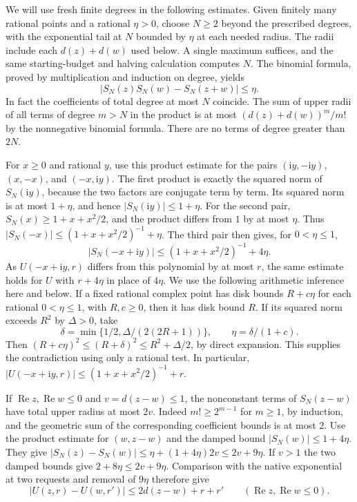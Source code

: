 \documentclass[11pt]{amsart}
\theoremstyle{definition}
\theoremstyle{remark}
\numberwithin{equation}{section}
\newcommand{\re}{\operatorname{Re}}
\begin{document}
We will use fresh finite degrees in the following estimates.
Given finitely many rational points and a rational $\eta>0$,
choose $N\ge2$ beyond the prescribed degrees, with the
exponential tail at $N$ bounded by $\eta$ at each needed
radius. The radii include each $d(z)+d(w)$ used below. A
single maximum suffices, and the same starting-budget and
halving calculation computes $N$. The binomial formula,
proved by multiplication and induction on degree, yields
\[
 |S_N(z)S_N(w)-S_N(z+w)|\le\eta .
\]
In fact the coefficients of total degree at most $N$
coincide. The sum of upper radii of all terms of degree
$m>N$ in the product is at most
$(d(z)+d(w))^m/m!$ by the nonnegative binomial formula.
There are no terms of degree greater than $2N$.

For $x\ge0$ and rational $y$, use this product estimate for
the pairs $(\mathrm i y,-\mathrm i y)$, $(x,-x)$,
and $(-x,\mathrm i y)$. The first product is exactly the
squared norm of $S_N(\mathrm i y)$, because the two factors
are conjugate term by term. Its squared norm is at most
$1+\eta$, and hence $|S_N(\mathrm i y)|\le1+\eta$.
For the second pair, $S_N(x)\ge1+x+x^2/2$, and the
product differs from $1$ by at most $\eta$. Thus
$|S_N(-x)|\le (1+x+x^2/2)^{-1}+\eta$.
The third pair then gives, for $0<\eta\le1$,
\[
 |S_N(-x+\mathrm i y)|\le (1+x+x^2/2)^{-1}+4\eta .
\]
As $U(-x+\mathrm i y,r)$ differs from this polynomial by at most
$r$, the same estimate holds for $U$ with $r+4\eta$ in place
of $4\eta$. We use the following arithmetic inference here
and below. If a fixed rational complex point has disk bounds
$R+c\eta$ for each rational $0<\eta\le1$, with $R,c\ge0$,
then it has disk bound $R$. If its squared norm exceeds $R^2$
by $\Delta>0$, take
\[
 \delta=\min\{1/2,\Delta/(2(2R+1))\},\qquad
 \eta=\delta/(1+c).
\]
Then $(R+c\eta)^2\le (R+\delta)^2\le R^2+\Delta/2$,
by direct expansion. This supplies the contradiction using
only a rational test. In particular,
$|U(-x+\mathrm i y,r)|\le (1+x+x^2/2)^{-1}+r$.

If $\re z,\re w\le0$ and $v=d(z-w)\le1$, the nonconstant
terms of $S_N(z-w)$ have total upper radius at most $2v$.
Indeed $m!\ge 2^{m-1}$ for $m\ge1$, by induction, and the
geometric sum of the corresponding coefficient bounds is
at most $2$. Use the product estimate for $(w,z-w)$ and
the damped bound $|S_N(w)|\le1+4\eta$. They give
$|S_N(z)-S_N(w)|\le\eta+(1+4\eta)2v\le2v+9\eta$.
If $v>1$ the two damped bounds give $2+8\eta\le2v+9\eta$.
Comparison with the native exponential at two requests and
removal of $9\eta$ therefore give
\[
 |U(z,r)-U(w,r')|\le2d(z-w)+r+r'
 \qquad(\re z,\re w\le0).
\]
\end{document}
